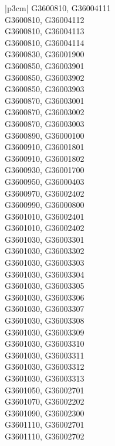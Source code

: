 \begin{customLongTable}{ |p{3cm}| }
G3600810, G36004111 \\ \hline
G3600810, G36004112 \\ \hline
G3600810, G36004113 \\ \hline
G3600810, G36004114 \\ \hline
G3600830, G36001900 \\ \hline
G3600850, G36003901 \\ \hline
G3600850, G36003902 \\ \hline
G3600850, G36003903 \\ \hline
G3600870, G36003001 \\ \hline
G3600870, G36003002 \\ \hline
G3600870, G36003003 \\ \hline
G3600890, G36000100 \\ \hline
G3600910, G36001801 \\ \hline
G3600910, G36001802 \\ \hline
G3600930, G36001700 \\ \hline
G3600950, G36000403 \\ \hline
G3600970, G36002402 \\ \hline
G3600990, G36000800 \\ \hline
G3601010, G36002401 \\ \hline
G3601010, G36002402 \\ \hline
G3601030, G36003301 \\ \hline
G3601030, G36003302 \\ \hline
G3601030, G36003303 \\ \hline
G3601030, G36003304 \\ \hline
G3601030, G36003305 \\ \hline
G3601030, G36003306 \\ \hline
G3601030, G36003307 \\ \hline
G3601030, G36003308 \\ \hline
G3601030, G36003309 \\ \hline
G3601030, G36003310 \\ \hline
G3601030, G36003311 \\ \hline
G3601030, G36003312 \\ \hline
G3601030, G36003313 \\ \hline
G3601050, G36002701 \\ \hline
G3601070, G36002202 \\ \hline
G3601090, G36002300 \\ \hline
G3601110, G36002701 \\ \hline
G3601110, G36002702 \\ \hline

\end{customLongTable}
